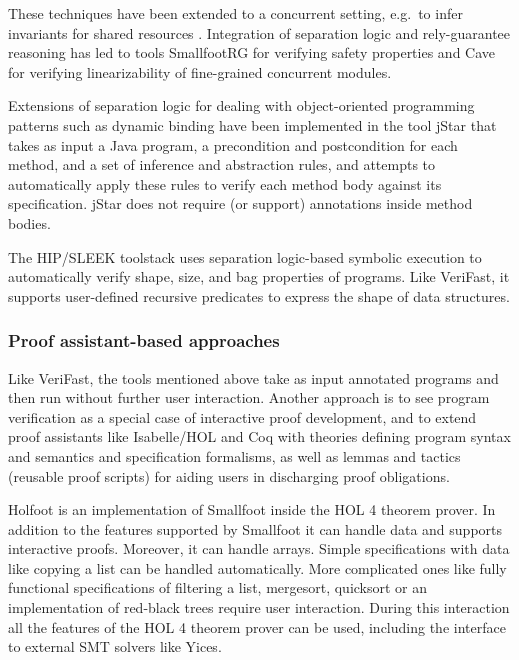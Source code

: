 \documentclass{CSML}
\theoremstyle{definition}\newtheorem{notation}[thm]{Notation}
\theoremstyle{plain}\newtheorem{satz}[thm]{Satz}
\begin{document}
These techniques have been extended to a concurrent setting, e.g.~to infer invariants for shared resources \cite{distefano-resource-invariants}. Integration of
separation logic and rely-guarantee reasoning \cite{DBLP:conf/ifip/Jones83} has led to tools SmallfootRG \cite{smallfootrg} for verifying safety properties
and Cave \cite{cave} for verifying linearizability of fine-grained concurrent modules.

Extensions of separation logic for dealing with object-oriented programming patterns such as dynamic binding have been implemented in the tool jStar \cite{jstar}
that takes as input a Java program, a precondition and postcondition for each method, and a set of inference and abstraction rules, and attempts to automatically apply
these rules to verify each method body against its specification. jStar does not require (or support) annotations inside method bodies.

The HIP/SLEEK toolstack \cite{DBLP:journals/scp/ChinDNQ12} uses separation logic-based symbolic execution to automatically verify shape, size, and bag properties
of programs. Like VeriFast, it supports user-defined recursive predicates to express the shape of data structures.

\subsubsection{Proof assistant-based approaches}

Like VeriFast, the tools mentioned above take as input annotated programs and then run without further user interaction.
Another approach is to see program verification as a special case of interactive proof development, and to extend proof assistants like Isabelle/HOL and Coq
with theories defining program syntax and semantics and specification formalisms, as well as lemmas and tactics (reusable proof scripts) for aiding users in discharging
proof obligations.

Holfoot \cite{UCAM-CL-TR-799} is an implementation of Smallfoot inside the HOL 4 theorem prover.
In addition to the features supported by Smallfoot it can handle data and supports interactive proofs.
Moreover, it can handle arrays. Simple specifications with data like copying a list can be handled automatically.
More complicated ones like fully functional specifications of filtering a list, mergesort, quicksort or an
implementation of red-black trees require user interaction.
During this interaction all the features of the HOL 4 theorem prover can be used, including the interface to external SMT solvers like Yices.
\end{document}
